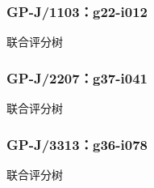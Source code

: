 \par\noindent\begin{minipage}{\linewidth}
\subsubsection{GP-J/1103：g22-i012}\leavevmode\par
\noindent\begin{minipage}{\linewidth}
联合评分树\par
\begin{center}\end{center}
\end{minipage}\par\medskip
\end{minipage}\par\bigskip
\par\noindent\begin{minipage}{\linewidth}
\subsubsection{GP-J/2207：g37-i041}\leavevmode\par
\noindent\begin{minipage}{\linewidth}
联合评分树\par
\begin{center}\end{center}
\end{minipage}\par\medskip
\end{minipage}\par\bigskip
\par\noindent\begin{minipage}{\linewidth}
\subsubsection{GP-J/3313：g36-i078}\leavevmode\par
\noindent\begin{minipage}{\linewidth}
联合评分树\par
\begin{center}\end{center}
\end{minipage}\par\medskip
\end{minipage}\par\bigskip
